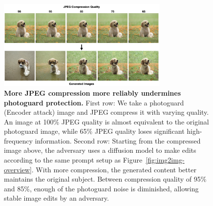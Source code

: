 \begin{figure}[t]
\begin{center}
\includegraphics[width=0.75\textwidth]{images/jpeg-compression-figure.001.png}
\end{center}
\caption{\textbf{More JPEG compression more reliably undermines photoguard protection.} First row: We take a photoguard (Encoder attack) image  and JPEG compress it with varying quality. An image at 100\% JPEG quality is almost equivalent to the original photoguard image, while 65\% JPEG quality loses significant high-frequency information. Second row: Starting from the compressed image above, the adversary uses a diffusion model to make edits according to the same prompt setup as Figure~\ref{fig:img2img-overview}. With more compression, the generated content better maintains the original subject. Between compression quality of 95\% and 85\%, enough of the photoguard  noise is diminished, allowing stable image edits by an adversary.}
\label{figure-jpeg-compression-img2img}
\end{figure}